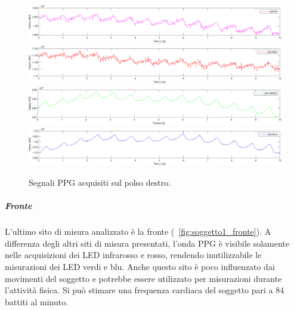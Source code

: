 \begin{figure}[h]
	\centering
	\includegraphics[width=1\linewidth]{ImageFiles/Misure Preliminari/Soggetto 1/polso_ired}
	\includegraphics[width=1\linewidth]{ImageFiles/Misure Preliminari/Soggetto 1/polso_red}
	\includegraphics[width=1\linewidth]{ImageFiles/Misure Preliminari/Soggetto 1/polso_green}
	\includegraphics[width=1\linewidth]{ImageFiles/Misure Preliminari/Soggetto 1/polso_blu}
	\caption{Segnali PPG acquisiti sul polso destro.}
	\label{fig:soggetto1_polso}
\end{figure}

\clearpage

\subparagraph{Fronte}

L'ultimo sito di misura analizzato è la fronte (\Fig~\ref{fig:soggetto1_fronte}). A differenza degli altri siti di misura presentati, l'onda PPG è visibile solamente nelle acquisizioni dei LED infrarosso e rosso, rendendo inutilizzabile le misurazioni dei LED verdi e blu. Anche questo sito è poco influenzato dai movimenti del soggetto e potrebbe essere utilizzato per misurazioni durante l'attività fisica. Si può stimare una frequenza cardiaca del soggetto pari a 84 battiti al minuto.

